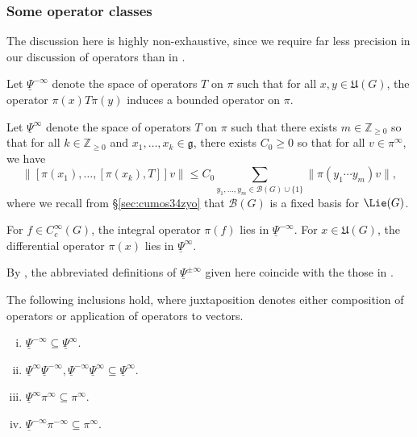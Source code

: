 \subsubsection{Some operator classes}\label{sec:negligible-operators}
The discussion here is highly non-exhaustive, since we require far less precision in our discussion of operators than in \cite{nelson-venkatesh-1, 2020arXiv201202187N}.
\begin{definition}
  Let $\underline{\Psi }^{-\infty}$ denote the space of operators $T$ on $\pi$ such that for all $x,y \in \mathfrak{U}(G)$, the operator $\pi(x) T \pi(y)$ induces a bounded operator on $\pi$.
\end{definition}
\begin{definition}
  Let $\underline{\Psi }^{\infty}$ denote the space  of operators $T$ on $\pi$ such that there exists $m \in \mathbb{Z}_{\geq 0}$ so that for all $k \in \mathbb{Z}_{\geq 0}$ and $x_1,\dotsc,x_k \in \mathfrak{g}$, there exists $C_0 \geq 0$ so that for all $v \in \pi^\infty$, we have
  \begin{equation*}
    \|[\pi(x_1), \dotsc, [\pi(x_k), T] ] v\| \leq C_0 \sum_{y_1,\dotsc,y_m \in \mathcal{B}(G) \cup \{1\}} \|\pi(y_1 \dotsb y_m) v\|,
  \end{equation*}
  where we recall from \S\ref{sec:cumos34zyo} that $\mathcal{B}(G)$ is a fixed basis for $\Lie(G)$.
\end{definition}
\begin{example}
  For $f \in C_c^\infty(G)$, the integral operator $\pi(f)$ lies in $\underline{\Psi }^{-\infty}$.  For $x \in \mathfrak{U}(G)$, the differential operator $\pi(x)$ lies in $\underline{\Psi }^{\infty}$.
\end{example}
\begin{remark}
  By \cite[(3.1), Lem 3.5, Prop 8.2]{nelson-venkatesh-1}, the abbreviated definitions of $\underline{\Psi }^{\pm \infty}$ given here coincide with the those in \cite[\S10]{2020arXiv201202187N}.
\end{remark}
\begin{lemma}\label{lem:foll-incl-hold}
  The following inclusions hold, where juxtaposition denotes either composition of operators or application of operators to vectors.
  \begin{enumerate}[(i)]
  \item $\underline{\Psi}^{-\infty} \subseteq \underline{\Psi}^{\infty}$.
  \item $\underline{\Psi}^{\infty} \underline{\Psi}^{-\infty}, \underline{\Psi}^{-\infty} \underline{\Psi}^{\infty} \subseteq \underline{\Psi}^{\infty}$.
  \item $\underline{\Psi }^{\infty} \pi^\infty \subseteq \pi^\infty$.
  \item $\underline{\Psi }^{-\infty} \pi^{-\infty} \subseteq \pi^\infty$.
  \end{enumerate}
\end{lemma}
